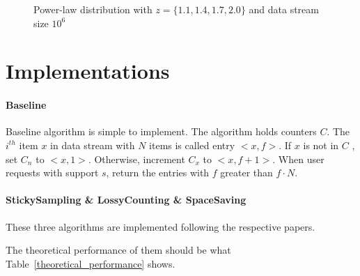 \documentclass[10pt]{article}
\begin{document}
\begin{figure}[!t]
     \begin{subfigure}[b]{0.5\textwidth}
          \centering
          \label{power-law-z-1.1-100-stream-1000000}
    \end{subfigure}
    \begin{subfigure}[b]{0.5\textwidth}
          \centering
          \label{power-law-z-1.4-100-stream-1000000}
    \end{subfigure}
    \begin{subfigure}[b]{0.5\textwidth}
          \centering
          \label{power-law-z-1.7-100-stream-1000000}
    \end{subfigure}
    \begin{subfigure}[b]{0.5\textwidth}
          \centering
          \label{power-law-z-2.0-100-stream-1000000}
    \end{subfigure}
 
    \caption{Power-law distribution with $z = \{1.1, 1.4, 1.7, 2.0\}$ and data stream size $10^6$}
    \label{powerlaw}
\end{figure}

\section{Implementations}
\paragraph{Baseline}
Baseline algorithm is simple to implement. The algorithm holds counters $C$.
The $i^{th}$ item $x$ in data stream with $N$ items is called entry $<x, f>$. 
If $x$ is not in $C$ , set $C_n$ to $<x, 1>$. Otherwise, increment $C_x$ to $<x, f+1>$.
When user requests with support $s$, return the entries with $f$ greater than $f\cdot{}N$.
\paragraph{StickySampling \& LossyCounting \& SpaceSaving}
These three algorithms are implemented following the respective papers.

The theoretical performance of them should be what Table~\ref{theoretical_performance} shows.
\end{document}
